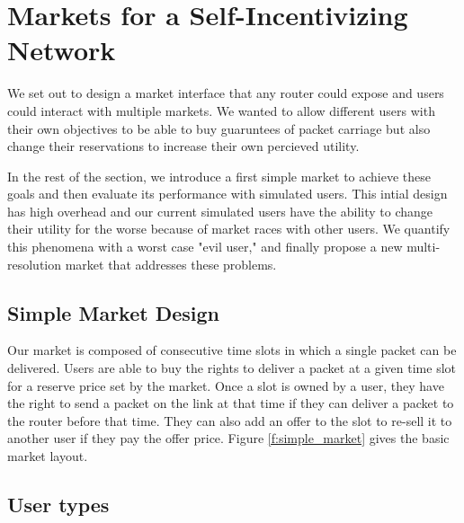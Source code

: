 \section{Markets for a Self-Incentivizing Network}
\label{sec:designs}
We set out to design a market interface that any router could expose and users could interact with multiple markets.
We wanted to allow different users with their own objectives to be able to buy guaruntees of packet carriage but also change their reservations to increase their own percieved utility.

In the rest of the section, we introduce a first simple market to achieve these goals and then evaluate its performance with simulated users.
This intial design has high overhead and our current simulated users have the ability to change their utility for the worse because of market races with other users. We quantify this phenomena with a worst case "evil user," and finally propose a new multi-resolution market that addresses these problems.

%
%
%
%

\subsection{Simple Market Design}
Our market is composed of consecutive time slots in which a single packet can be delivered. Users are able to buy the rights to deliver a packet at a given time slot for a reserve price set by the market. Once a slot is owned by a user, they have the right to send a packet on the link at that time if they can deliver a packet to the router before that time. They can also add an offer to the slot to re-sell it to another user if they pay the offer price. Figure \ref{f:simple_market} gives the basic market layout.

\subsection{User types}

